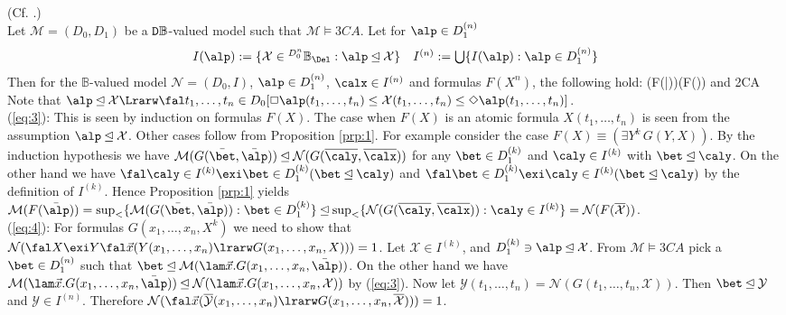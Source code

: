 \documentclass{article}
\begin{document}
\blem\label{lem:3}{\rm (Cf. \cite{Takahashi, Prawitz, Maehara}.)}
\\
Let $\mathcal{M}=(D_{0},D_{1})$ be a ${\tt D}\mathbb{B}$-valued model such that $\mathcal{M}\models 3CA$.
Let for $\alp\in D_{1}^{(n)}$
\[
\begin{array}{cc}
I(\alp)  :=  \{\mathcal{X}\in{}^{D_{0}^{n}}\mathbb{B}_{\Del}: \alp\unlhd\mathcal{X}\}
&
I^{(n)}  :=  \bigcup\{I(\alp):\alp\in D_{1}^{(n)}\}
\end{array}
\]
Then for the
$\mathbb{B}$-valued model $\mathcal{N}=(D_{0},I)$, $\alp\in D_{1}^{(n)}$, $\calx\in I^{(n)}$ and 
formulas $F(X^{n})$, the following hold:
\beqn\label{eq:3}
\alp\unlhd{} \Rarw {}(F(\bar{\alp}))\unlhd{}(F())
\eeqn
and
\beqn\label{eq:4}
\models 2CA
\eeqn
\elem
\bprf
Note that $\alp\unlhd\mathcal{X} \Lrarw \fal t_{1},\ldots,t_{n}\in D_{0}[\Box\alp(t_{1},\ldots,t_{n})\leq\mathcal{X}(t_{1},\ldots,t_{n})\leq\Diamond\alp(t_{1},\ldots,t_{n})]$.
\\
(\ref{eq:3}):
This is seen by induction on formulas $F(X)$.
The case when $F(X)$ is an atomic formula $X(t_{1},\ldots,t_{n})$ is seen from the assumption $\alp\unlhd\mathcal{X}$.
Other cases follow from Proposition \ref{prp:1}.
For example consider the case $F(X)\equiv(\exi Y^{k}\, G(Y,X))$.
By the induction hypothesis we have 
$\mathcal{M}(G(\bar{\bet},\bar{\alp}))\unlhd\mathcal{N}(G(\overline{\caly},\overline{\calx}))$  
for any $\bet\in D_{1}^{(k)}$ and $\caly\in I^{(k)}$ with $\bet\unlhd\caly$.
On the other hand we have
$\fal \caly\in I^{(k)}\exi \bet\in D_{1}^{(k)}(\bet\unlhd\caly)$ and $\fal\bet\in D_{1}^{(k)}\exi \caly\in I^{(k)}(\bet\unlhd\caly)$
by the definition of $I^{(k)}$.
Hence Proposition \ref{prp:1} yields
$\mathcal{M}(F(\bar{\alp}))=\sup_{<}\{\mathcal{M}(G(\bar{\bet},\bar{\alp})): \bet\in D_{1}^{(k)}\}\unlhd
\sup_{<}\{\mathcal{N}(G(\overline{\caly},\overline{\calx})): \caly\in I^{(k)}\}=\mathcal{N}(F(\overline{\mathcal{X}}))$.
\\
(\ref{eq:4}):
For formulas $G(x_{1},\ldots,x_{n},X^{k})$ we need to show that
\\
$\mathcal{N}(\fal X\exi Y\fal \vec{x}(Y(x_{1},\ldots,x_{n})\lrarw G(x_{1},\ldots,x_{n},X)))=1$.
Let $\mathcal{X}\in I^{(k)}$, and
$D_{1}^{(k)}\ni\alp\unlhd\mathcal{X}$.
From $\mathcal{M}\models 3CA$ pick a
$\bet\in D_{1}^{(n)}$ such that $\bet\unlhd\mathcal{M}(\lam \vec{x}. G(x_{1},\ldots,x_{n},\bar{\alp}))$.
On the other hand we have
$\mathcal{M}(\lam \vec{x}. G(x_{1},\ldots,x_{n},\bar{\alp}))\unlhd\mathcal{N}(\lam \vec{x}. G(x_{1},\ldots,x_{n},\mathcal{X}))$
by (\ref{eq:3}).
Now let $\mathcal{Y}(t_{1},\ldots,t_{n})=\mathcal{N}(G(t_{1},\ldots,t_{n},\mathcal{X}))$.
Then $\bet\unlhd\mathcal{Y}$ and $\mathcal{Y}\in I^{(n)}$.
Therefore
$\mathcal{N}(\fal \vec{x}(\overline{\mathcal{Y}}(x_{1},\ldots,x_{n})\lrarw G(x_{1},\ldots,x_{n},\overline{\mathcal{X}})))=1$.
\eprf
\end{document}

